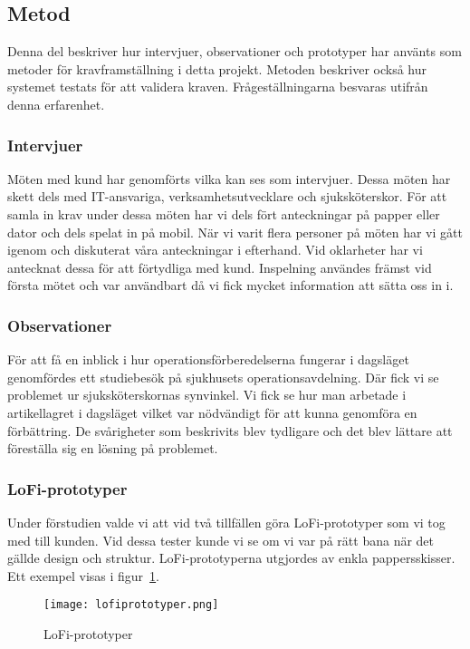  
\subsection{Metod}
Denna del beskriver hur intervjuer, observationer och prototyper har använts som metoder för kravframställning i detta projekt. Metoden beskriver också hur systemet testats för att validera kraven. Frågeställningarna besvaras utifrån denna erfarenhet.

\subsubsection{Intervjuer}
Möten med kund har genomförts vilka kan ses som intervjuer. Dessa möten har skett dels med IT-ansvariga, verksamhetsutvecklare och sjuksköterskor. För att samla in krav under dessa möten har vi dels fört anteckningar på papper eller dator och dels spelat in på mobil. När vi varit flera personer på möten har vi gått igenom och diskuterat våra anteckningar i efterhand. Vid oklarheter har vi antecknat dessa för att förtydliga med kund. Inspelning användes främst vid första mötet och var användbart då vi fick mycket information att sätta oss in i. 

\subsubsection{Observationer}
För att få en inblick i hur operationsförberedelserna fungerar i dagsläget genomfördes ett studiebesök på sjukhusets operationsavdelning. Där fick vi se problemet ur sjuksköterskornas synvinkel. Vi fick se hur man arbetade i artikellagret i dagsläget vilket var nödvändigt för att kunna genomföra en förbättring. De svårigheter som beskrivits blev tydligare och det blev lättare att föreställa sig en lösning på problemet.

\subsubsection{LoFi-prototyper}
Under förstudien valde vi att vid två tillfällen göra LoFi-prototyper som vi tog med till kunden. Vid dessa tester kunde vi se om vi var på rätt bana när det gällde design och struktur. LoFi-prototyperna utgjordes av enkla pappersskisser. Ett exempel visas i figur~\ref{fig:lofiprototyper}.
\begin{figure}[htbp]
\begin{center}
\texttt{[image: lofiprototyper.png]}
\caption{LoFi-prototyper}
\label{fig:lofiprototyper}
\end{center}
\end{figure}

